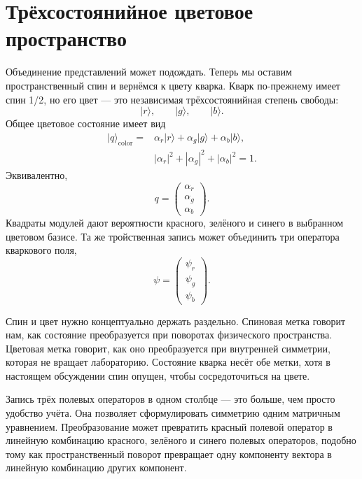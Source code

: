 \section{Трёхсостоянийное цветовое пространство}

Объединение представлений может подождать. Теперь мы оставим пространственный спин и вернёмся к цвету кварка. Кварк по-прежнему имеет спин 1/2, но его цвет — это независимая трёхсостоянийная степень свободы:
\begin{equation}
\lvert r\rangle,\qquad
\lvert g\rangle,\qquad
\lvert b\rangle.
\end{equation}
Общее цветовое состояние имеет вид
\begin{equation}
\begin{aligned}
\lvert q\rangle_{\mathrm{color}}
={}&
\alpha_r\lvert r\rangle
+\alpha_g\lvert g\rangle
+\alpha_b\lvert b\rangle,
\\
&|\alpha_r|^2+|\alpha_g|^2+|\alpha_b|^2=1.
\end{aligned}
\end{equation}
Эквивалентно,
\begin{equation}
q=
\begin{pmatrix}
\alpha_r\\
\alpha_g\\
\alpha_b
\end{pmatrix}.
\end{equation}
Квадраты модулей дают вероятности красного, зелёного и синего в выбранном цветовом базисе. Та же тройственная запись может объединить три оператора кваркового поля,
\begin{equation}
\psi=
\begin{pmatrix}
\psi_r\\
\psi_g\\
\psi_b
\end{pmatrix}.
\end{equation}

Спин и цвет нужно концептуально держать раздельно. Спиновая метка говорит нам, как состояние преобразуется при поворотах физического пространства. Цветовая метка говорит, как оно преобразуется при внутренней симметрии, которая не вращает лабораторию. Состояние кварка несёт обе метки, хотя в настоящем обсуждении спин опущен, чтобы сосредоточиться на цвете.

Запись трёх полевых операторов в одном столбце — это больше, чем просто удобство учёта. Она позволяет сформулировать симметрию одним матричным уравнением. Преобразование может превратить красный полевой оператор в линейную комбинацию красного, зелёного и синего полевых операторов, подобно тому как пространственный поворот превращает одну компоненту вектора в линейную комбинацию других компонент.

